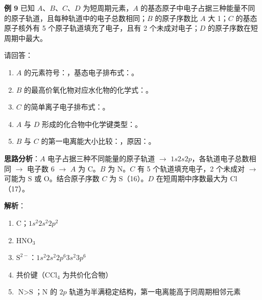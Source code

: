 \textbf{例 9} 已知 $A$、$B$、$C$、$D$ 为短周期元素，$A$ 的基态原子中电子占据三种能量不同的原子轨道，且每种轨道中的电子总数相同；$B$ 的原子序数比 $A$ 大 1；$C$ 的基态原子核外有 5 个原子轨道填充了电子，且有 2 个未成对电子；$D$ 的原子序数在短周期中最大。

请回答：
\begin{enumerate}
  \item $A$ 的元素符号：\underline{\qquad\qquad}，基态电子排布式：\underline{\qquad\qquad}。
  \item $B$ 的最高价氧化物对应水化物的化学式：\underline{\qquad\qquad}。
  \item $C$ 的简单离子电子排布式：\underline{\qquad\qquad}。
  \item $A$ 与 $D$ 形成的化合物中化学键类型：\underline{\qquad\qquad}。
  \item $B$ 与 $C$ 的第一电离能大小比较：\underline{\qquad\qquad}，原因：\underline{\qquad\qquad}。
\end{enumerate}

\textbf{思路分析}：$A$ 电子占据三种不同能量的原子轨道 $\to$ $1s2s2p$，各轨道电子总数相同 $\to$ 电子数 6 $\to$ $A$ 为 $\text{C}$。$B$ 为 $\text{N}$。$C$ 有 5 个轨道填充电子，2 个未成对 $\to$ 可能为 $\text{S}$ 或 $\text{O}$。结合原子序数 $C$ 为 $\text{S}$（16）。$D$ 在短周期中序数最大为 $\text{Cl}$（17）。

\textbf{解析}：
\begin{enumerate}
  \item $\text{C}$；$1s^2 2s^2 2p^2$
  \item $\text{HNO}_3$
  \item $\text{S}^{2-}$：$1s^2 2s^2 2p^6 3s^2 3p^6$
  \item 共价键（$\text{CCl}_4$ 为共价化合物）
  \item $\text{N} > \text{S}$；$\text{N}$ 的 $2p$ 轨道为半满稳定结构，第一电离能高于同周期相邻元素
\end{enumerate}
